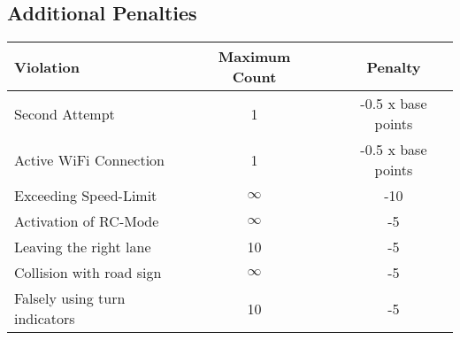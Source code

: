 {	

	\subsection*{Additional Penalties}
	\begin{table}[H]
		\begin{tabular}{@{}lccc@{}}
			\toprule
			\textbf{Violation}            & \textbf{Maximum Count} &  & \textbf{Penalty}   \\
			\midrule
			Second Attempt                & 1                      &  & -0.5 x base points \\
			Active WiFi Connection        & 1                      &  & -0.5 x base points \\
			Exceeding Speed-Limit         & $\infty$               &  & -10                \\
			Activation of RC-Mode         & $\infty$               &  & -5                 \\
			Leaving the right lane        & 10                     &  & -5                 \\
			Collision with road sign      & $\infty$               &  & -5                 \\
			Falsely using turn indicators & 10                     &  & -5                 \\
			\bottomrule
		\end{tabular}
	\end{table}
	\clearpage
}